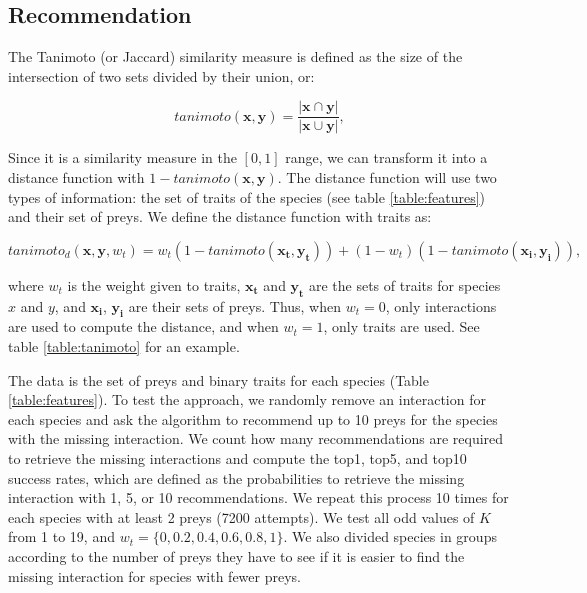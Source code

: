 \documentclass[letterpaper]{article}
\begin{document}
\subsection{Recommendation}

The Tanimoto (or Jaccard) similarity measure is defined as the size of the
intersection of two sets divided by their union, or:

\begin{equation}
  tanimoto(\mathbf{x}, \mathbf{y}) = \frac{\left\vert\mathbf{x} \cap \mathbf{y}\right\vert}{\left\vert\mathbf{x} \cup \mathbf{y}\right\vert},
\end{equation}

Since it is a similarity measure in the $[0, 1]$ range, we can transform it
into a distance function with $1 - tanimoto(\mathbf{x}, \mathbf{y})$. The
distance function will use two types of information: the set of traits of the
species (see table \ref{table:features}) and their set of preys. We define the
distance function with traits as:

\begin{equation}
  tanimoto_d(\mathbf{x}, \mathbf{y}, w_t) = w_t(1 - tanimoto(\mathbf{x_t}, \mathbf{y_t})) + (1 - w_t)(1 - tanimoto(\mathbf{x_i}, \mathbf{y_i})),
\end{equation}

where $w_t$ is the weight given to traits, $\mathbf{x_t}$ and $\mathbf{y_t}$
are the sets of traits for species $x$ and $y$, and $\mathbf{x_i}$,
$\mathbf{y_i}$ are their sets of preys. Thus, when $w_t = 0$, only interactions
are used to compute the distance, and when $w_t = 1$, only traits are used. See
table \ref{table:tanimoto} for an example.

The data is the set of preys and binary traits for each species (Table
\ref{table:features}). To test the approach, we randomly remove an interaction
for each species and ask the algorithm to recommend up to 10 preys for the
species with the missing interaction. We count how many recommendations are
required to retrieve the missing interactions and compute the top1, top5, and
top10 success rates, which are defined as the probabilities to retrieve the
missing interaction with 1, 5, or 10 recommendations. We repeat this process 10
times for each species with at least 2 preys (7200 attempts). We test all odd
values of $K$ from 1 to 19, and $w_t = \{0, 0.2, 0.4, 0.6, 0.8, 1\}$. We also
divided species in groups according to the number of preys they have to see if
it is easier to find the missing interaction for species with fewer preys.
\end{document}

